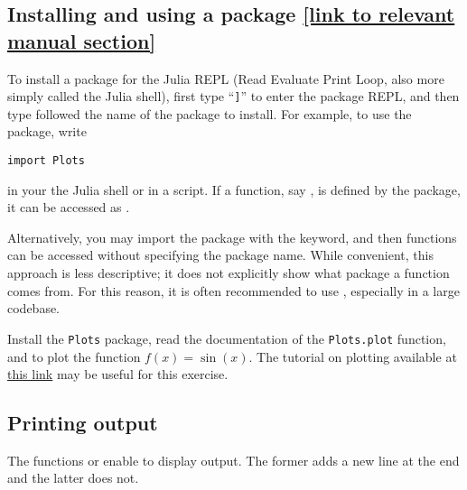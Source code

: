 
\subsection*{Installing and using a package {\footnotesize \href{https://docs.julialang.org/en/v1/stdlib/Pkg/}{[link to relevant manual section]}}}%
\label{sub:installing_and_using_a_package}
To install a package for the Julia REPL (Read Evaluate Print Loop, also more simply called the Julia shell),
first type ``\texttt{]}'' to enter the package REPL,
and then type  followed the name of the package to install.
For example, to use the  package, write
\begin{verbatim}
import Plots
\end{verbatim}
in your the Julia shell or in a script.
If a function, say , is defined by the package,
it can be accessed as .

Alternatively, you may import the package with the  keyword,
and then functions can be accessed without specifying the package name.
While convenient, this approach is less descriptive;
it does not explicitly show what package a function comes from.
For this reason, it is often recommended to use ,
especially in a large codebase.

\begin{task}
    Install the \texttt{Plots} package,
    read the documentation of the \texttt{Plots.plot} function,
    and to plot the function $f(x) = \sin(x)$.
    The tutorial on plotting available at \href{https://docs.juliaplots.org/latest/tutorial/} {this link}
    may be useful for this exercise.
\end{task}

\subsection*{Printing output}%
The functions  or  enable to display output.
The former adds a new line at the end and the latter does not.


